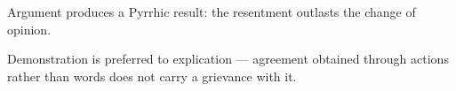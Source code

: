 

\begin{distilled}
  \item Argument produces a Pyrrhic result: the resentment outlasts the change of opinion.
  \item Demonstration is preferred to explication --- agreement obtained through actions rather than words does not carry a grievance with it.
\end{distilled}
